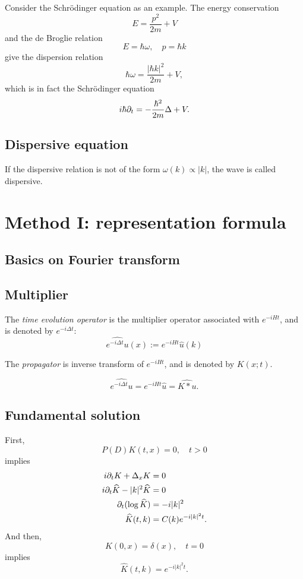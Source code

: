 \documentclass{../exp}
\begin{document}
Consider the Schr\"odinger equation as an example.
The energy conservation
\[E=\frac{p^2}{2m}+V\]
and the de Broglie relation
\[E=\hbar\omega,\quad p=\hbar k\]
give the dispersion relation
\[\hbar\omega=\frac{|\hbar k|^2}{2m}+V,\]
which is in fact the Schr\"odinger equation
\[i\hbar\pd_t=-\frac{\hbar^2}{2m}\Delta+V.\]

\subsection{Dispersive equation}
\begin{defn}
If the dispersive relation is not of the form $\omega(k)\propto|k|$, the wave is called dispersive.
\end{defn}



\section{Method I: representation formula}

\subsection{Basics on Fourier transform}





\subsection{Multiplier}



\begin{defn}
The \emph{time evolution operator} is the multiplier operator associated with $e^{-iHt}$, and is denoted by $e^{-i\Delta t}$:
\[\hat{e^{-i\Delta t}u}(x):=e^{-iHt}\hat u(k)\]
\end{defn}
\begin{defn}
The \emph{propagator} is inverse transform of $e^{-iHt}$, and is denoted by $K(x;t)$.
\end{defn}
\[\hat{e^{-i\Delta t}u}=e^{-iHt}\hat u=\hat{K*u}.\]


% 
\subsection{Fundamental solution}
First,
\[P(D)K(t,x)=0,\quad t>0\]
implies
\begin{align*}
i\pd_tK+\Delta_xK&=0\\
i\pd_t\hat{K}-|k|^2\hat{K}&=0\\
\pd_t(\log\hat{K})&=-i|k|^2\\
\hat{K}(t,k)&=C(k)e^{-i|k|^2t}.
\end{align*}
And then,
\[K(0,x)=\delta(x),\quad t=0\]
implies
\[\hat{K}(t,k)=e^{-i|k|^2t}.\]
\end{document}
